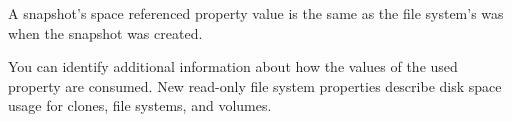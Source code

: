 \documentclass[12pt,twoside]{article}
\begin{document}
A snapshot's space referenced property value is the same as the file system's was when the snapshot was created.

You can identify additional information about how the values of the used property are consumed. New read-only file system properties describe disk space usage for clones, file systems, and volumes.





\end{document}
